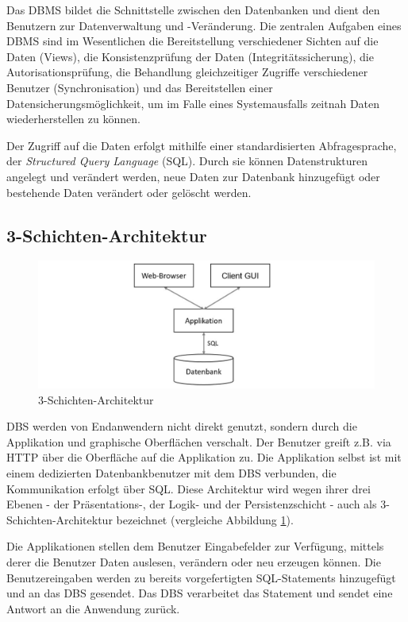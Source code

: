 Das DBMS bildet die Schnittstelle zwischen den Datenbanken und dient den Benutzern zur Datenverwaltung und -Veränderung. Die zentralen Aufgaben eines DBMS sind im Wesentlichen die Bereitstellung verschiedener Sichten auf die Daten (Views), die Konsistenzprüfung der Daten (Integritätssicherung), die Autorisationsprüfung, die Behandlung gleichzeitiger Zugriffe verschiedener Benutzer (Synchronisation) und das Bereitstellen einer Datensicherungsmöglichkeit, um im Falle eines Systemausfalls zeitnah Daten wiederherstellen zu können.

Der Zugriff auf die Daten erfolgt mithilfe einer standardisierten Abfragesprache, der \emph{Structured Query Language} (SQL). Durch sie können Datenstrukturen angelegt und verändert werden, neue Daten zur Datenbank hinzugefügt oder bestehende Daten verändert oder gelöscht werden. 

\subsection{3-Schichten-Architektur}
\begin{figure}[H]
	\centering
	\includegraphics[width=\textwidth]{images/SQL_Injection/3TierArchitecture.jpg}
	\caption{3-Schichten-Architektur}
	\label{fig:3TierArchitecture}
\end{figure}

DBS werden von Endanwendern nicht direkt genutzt, sondern durch die Applikation und graphische Oberflächen verschalt. Der Benutzer greift z.B. via HTTP über die Oberfläche auf die Applikation zu. Die Applikation selbst ist mit einem dedizierten Datenbankbenutzer mit dem DBS verbunden, die Kommunikation erfolgt über SQL. Diese Architektur wird wegen ihrer drei Ebenen - der Präsentations-, der Logik- und der Persistenzschicht - auch als 3-Schichten-Architektur bezeichnet (vergleiche Abbildung \ref{fig:3TierArchitecture}). 

Die Applikationen stellen dem Benutzer Eingabefelder zur Verfügung, mittels derer die Benutzer Daten auslesen, verändern oder neu erzeugen können. Die Benutzereingaben werden zu bereits vorgefertigten SQL-Statements hinzugefügt und an das DBS gesendet. Das DBS verarbeitet das Statement und sendet eine Antwort an die Anwendung zurück.


